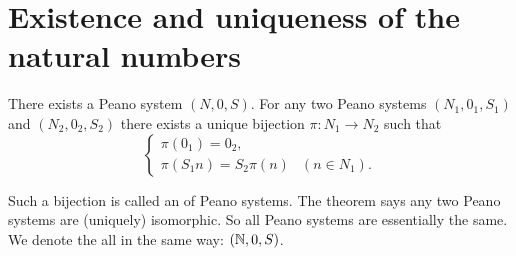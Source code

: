 \section{Existence and uniqueness of the natural numbers}
\begin{theorem} \label{theorem:existenceUniquenessPeano}
There exists a Peano system $(N,0,S)$. For any two Peano systems $(N_1,0_1,S_1)$ and
$(N_2,0_2,S_2)$ there exists a unique bijection $\pi: N_1 \to N_2$ such that
\[ \begin{cases}
\pi(0_1) = 0_2, \\
\pi(S_1n) = S_2\pi(n) & (n\in N_1).
\end{cases} \]
\end{theorem}
Such a bijection is called an  of Peano systems. The theorem says any two Peano systems are (uniquely) isomorphic. So all Peano systems are essentially the same. We denote the all in the same way: $(\mathbb{N}, 0, S)$.
